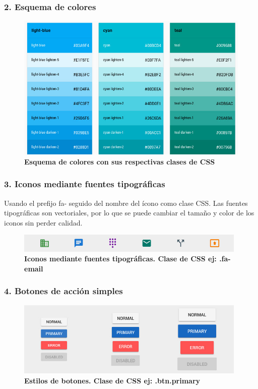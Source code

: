 \subsubsection{2. Esquema de colores}
\begin{figure}[h]
    \includegraphics[width=12cm]{Img/UX/guia0.jpg}
    \centering
    \caption{\textbf{ \footnotesize{Esquema de colores con sus respectivas clases de CSS}}}
\end{figure}


\subsubsection{3. Iconos mediante fuentes tipográficas}
    Usando el prefijo fa- seguido del nombre del ícono como clase CSS. Las fuentes tipográficas son vectoriales, por lo que se puede cambiar el tamaño y color de los iconos sin perder calidad.
    \begin{figure}[h]
    \includegraphics[width=11cm]{Img/UX/guia3.jpg}
    \centering
    \caption{\textbf{ \footnotesize{Iconos mediante fuentes tipográficas. Clase de CSS ej: .fa-email}}}
   
    \end{figure}
    
 
\subsubsection{4. Botones de acción simples}
    \begin{figure}[h]
    \includegraphics[width=11cm]{Img/UX/guia2.jpg}
    \centering
    \caption{\textbf{ \footnotesize{Estilos de botones. Clase de CSS ej: .btn.primary}}}
    \end{figure}
    
